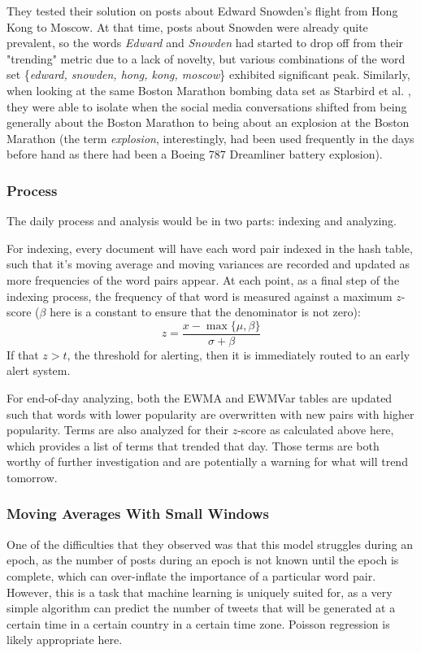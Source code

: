 \documentclass[preprint,review,12pt]{elsarticle}
\begin{document}
They tested their solution on posts about Edward Snowden's flight from Hong Kong to Moscow. At that time, posts about Snowden were already quite prevalent, so the words \textit{Edward} and \textit{Snowden} had started to drop off from their "trending" metric due to a lack of novelty, but various combinations of the word set \{\textit{edward, snowden, hong, kong, moscow}\} exhibited significant peak. Similarly, when looking at the same Boston Marathon bombing data set as Starbird et al. \cite{starbird2014rumors}, they were able to isolate when the social media conversations shifted from being generally about the Boston Marathon to being about an explosion at the Boston Marathon (the term \textit{explosion}, interestingly, had been used frequently in the days before hand as there had been a Boeing 787 Dreamliner battery explosion).

\subsubsection{Process}
The daily process and analysis would be in two parts: indexing and analyzing.

For indexing, every document will have each word pair indexed in the hash table, such that it's moving average and moving variances are recorded and updated as more frequencies of the word pairs appear. At each point, as a final step of the indexing process, the frequency of that word is measured against a maximum $z$-score ($\beta$ here is a constant to ensure that the denominator is not zero):
\begin{equation}
    z = \frac{x-\max\{\mu, \beta\}}{\sigma + \beta}
\end{equation}
If that $z > t$, the threshold for alerting, then it is immediately routed to an early alert system.

For end-of-day analyzing, both the EWMA and EWMVar tables are updated such that words with lower popularity are overwritten with new pairs with higher popularity. Terms are also analyzed for their $z$-score as calculated above here, which provides a list of terms that trended that day. Those terms are both worthy of further investigation and are potentially a warning for what will trend tomorrow.

\subsubsection{Moving Averages With Small Windows}
One of the difficulties that they observed was that this model struggles during an epoch, as the number of posts during an epoch is not known until the epoch is complete, which can over-inflate the importance of a particular word pair. However, this is a task that machine learning is uniquely suited for, as a very simple algorithm can predict the number of tweets that will be generated at a certain time in a certain country in a certain time zone. Poisson regression is likely appropriate here.
\end{document}
